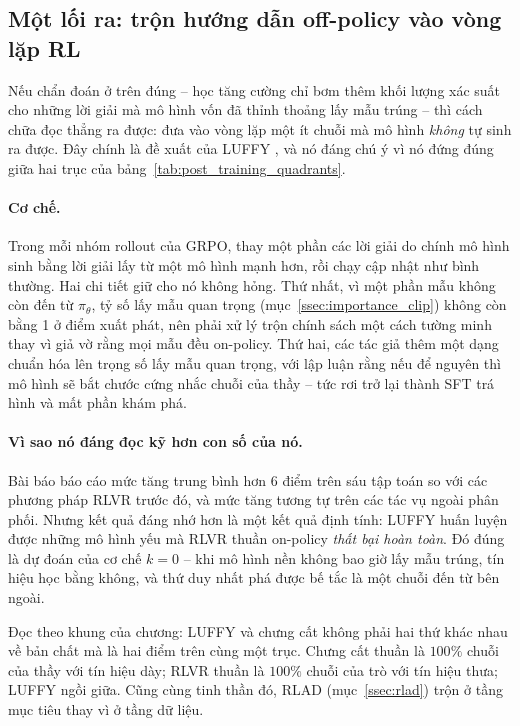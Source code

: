 \subsection{Một lối ra: trộn hướng dẫn off-policy vào vòng lặp RL}
\label{ssec:luffy}

Nếu chẩn đoán ở trên đúng -- học tăng cường chỉ bơm thêm khối lượng xác suất cho những lời giải mà mô hình vốn đã thỉnh thoảng lấy mẫu trúng -- thì cách chữa đọc thẳng ra được: đưa vào vòng lặp một ít chuỗi mà mô hình \emph{không} tự sinh ra được. Đây chính là đề xuất của LUFFY \cite{yan2025luffy}, và nó đáng chú ý vì nó đứng đúng giữa hai trục của bảng~\ref{tab:post_training_quadrants}.

\paragraph{Cơ chế.} Trong mỗi nhóm rollout của GRPO, thay một phần các lời giải do chính mô hình sinh bằng lời giải lấy từ một mô hình mạnh hơn, rồi chạy cập nhật như bình thường. Hai chi tiết giữ cho nó không hỏng. Thứ nhất, vì một phần mẫu không còn đến từ $\pi_\theta$, tỷ số lấy mẫu quan trọng (mục~\ref{ssec:importance_clip}) không còn bằng 1 ở điểm xuất phát, nên phải xử lý trộn chính sách một cách tường minh thay vì giả vờ rằng mọi mẫu đều on-policy. Thứ hai, các tác giả thêm một dạng chuẩn hóa lên trọng số lấy mẫu quan trọng, với lập luận rằng nếu để nguyên thì mô hình sẽ bắt chước cứng nhắc chuỗi của thầy -- tức rơi trở lại thành SFT trá hình và mất phần khám phá.

\paragraph{Vì sao nó đáng đọc kỹ hơn con số của nó.} Bài báo báo cáo mức tăng trung bình hơn 6 điểm trên sáu tập toán so với các phương pháp RLVR trước đó, và mức tăng tương tự trên các tác vụ ngoài phân phối. Nhưng kết quả đáng nhớ hơn là một kết quả định tính: LUFFY huấn luyện được những mô hình yếu mà RLVR thuần on-policy \emph{thất bại hoàn toàn}. Đó đúng là dự đoán của cơ chế $k = 0$ -- khi mô hình nền không bao giờ lấy mẫu trúng, tín hiệu học bằng không, và thứ duy nhất phá được bế tắc là một chuỗi đến từ bên ngoài.

Đọc theo khung của chương: LUFFY và chưng cất không phải hai thứ khác nhau về bản chất mà là hai điểm trên cùng một trục. Chưng cất thuần là $100\%$ chuỗi của thầy với tín hiệu dày; RLVR thuần là $100\%$ chuỗi của trò với tín hiệu thưa; LUFFY ngồi giữa. Cũng cùng tinh thần đó, RLAD (mục~\ref{ssec:rlad}) trộn ở tầng mục tiêu thay vì ở tầng dữ liệu.

